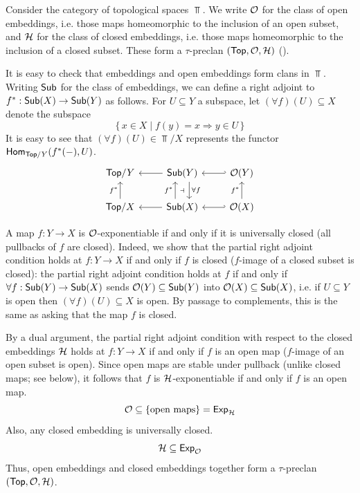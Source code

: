 \begin{example}
  \label{ex:top-opens}
  Consider the category of topological spaces $\Top$.
  We write $\mathcal{O}$ for the class of open embeddings,
  i.e. those maps homeomorphic to the inclusion of an open subset,
  and $\mathcal{H}$ for the class of closed embeddings,
  i.e. those maps homeomorphic to the inclusion of a closed subset.
  These form a $\tau$-preclan $(\mathsf{Top},\mathcal{O},\mathcal{H})$ ().

  It is easy to check that embeddings and open embeddings form clans in $\Top$.
  Writing $\mathsf{Sub}$ for the class of embeddings,
  we can define a right adjoint to $f^* : \mathsf{Sub}(X) \to \mathsf{Sub}(Y)$ as follows.
  For $U \subseteq Y$ a subspace,
  let $(\forall f)(U) \subseteq X$ denote the subspace
  \[\{\, x \in X \mid f(y) = x \Rightarrow y \in U \,\}\]
  It is easy to see that $(\forall f)(U) \in \Top/X$
  represents the functor $\mathsf{Hom}_{\mathsf{Top}/Y}(f^*(-), U)$.
  \[ \begin{tikzcd}
    {\Top / Y} & {\Sub(Y)} & {\OO(Y)} \\
    {\Top / X} & {\Sub(X)} & {\OO(X)}
    \arrow[from=1-2, to=1-1]
    \arrow[""{name=0, anchor=center, inner sep=0}, "{\forall f}", shift left=3, from=1-2, to=2-2]
    \arrow[hook', from=1-3, to=1-2]
    \arrow["{f^*}", from=2-1, to=1-1]
    \arrow[""{name=1, anchor=center, inner sep=0}, "{f^*}", shift left=3, from=2-2, to=1-2]
    \arrow[from=2-2, to=2-1]
    \arrow["{f^*}", from=2-3, to=1-3]
    \arrow[hook', from=2-3, to=2-2]
    \arrow["\dashv"{description}, draw=none, from=1, to=0]
  \end{tikzcd} \]
  
  A map $f : Y \to X$ is $\mathcal{O}$-exponentiable
  if and only if it is universally closed
  (all pullbacks of $f$ are closed).
  Indeed, we show that
  the partial right adjoint condition holds at $f : Y \to X$
  if and only if $f$ is closed ($f$-image of a closed subset is closed):
  the partial right adjoint condition holds at $f$
  if and only if 
  $\forall f : \mathsf{Sub}(Y) \to \mathsf{Sub}(X)$
  sends $\mathcal{O}(Y) \subseteq \mathsf{Sub}(Y)$ into $\mathcal{O}(X) \subseteq \mathsf{Sub}(X)$,
  i.e. if $U \subseteq Y$ is open then 
  $(\forall f)(U) \subseteq X$ is open.
  By passage to complements, this is the same as asking that the map $f$ is closed.
  
  By a dual argument,
  the partial right adjoint condition with respect to the closed embeddings
  $\mathcal{H}$ holds at $f : Y \to X$
  if and only if $f$ is an open map ($f$-image of an open subset is open).
  Since open maps are stable under pullback (unlike closed maps; see below),
  it follows that
  $f$ is $\mathcal{H}$-exponentiable if and only if
  $f$ is an open map.
  \[\mathcal{O} \subseteq \{\text{open maps}\} = \mathsf{Exp}_{\mathcal{H}}\]
  Also, any closed embedding is universally closed.
  \[\mathcal{H} \subseteq \mathsf{Exp}_{\mathcal{O}}\]
  Thus, open embeddings and closed embeddings together
  form a $\tau$-preclan $(\mathsf{Top},\mathcal{O},\mathcal{H})$.


\end{example}
